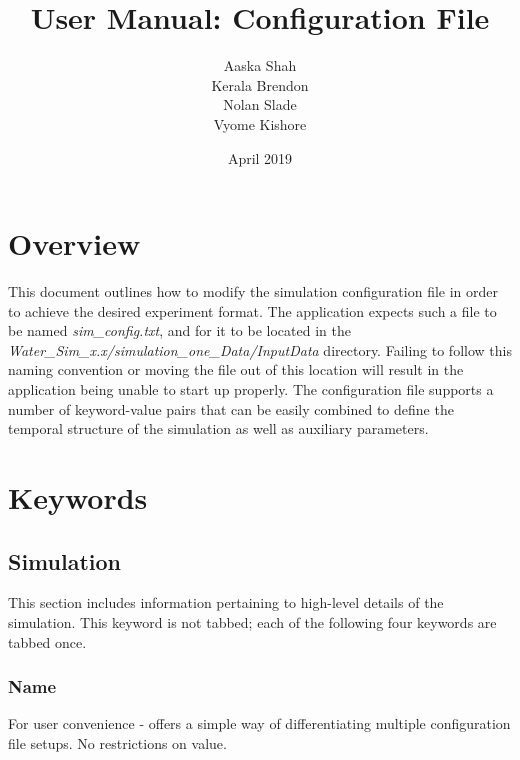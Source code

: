 \documentclass{article}
\title{User Manual: Configuration File}
\author{Aaska Shah\\Kerala Brendon\\Nolan Slade\\Vyome Kishore}
\date{April 2019}
\begin{document}
\maketitle

\section*{Overview}
This document outlines how to modify the simulation configuration file in order to achieve the desired experiment format. The application expects such a file to be named \textit{sim\_config.txt}, and for it to be located in the \textit{Water\_Sim\_x.x\slash simulation\_one\_Data\slash InputData} directory. Failing to follow this naming convention or moving the file out of this location will result in the application being unable to start up properly. The configuration file supports a number of keyword-value pairs that can be easily combined to define the temporal structure of the simulation as well as auxiliary parameters. 

\section*{Keywords}
\subsection*{Simulation}
This section includes information pertaining to high-level details of the simulation. This keyword is not tabbed; each of the following four keywords are tabbed once.

\subsubsection*{Name} For user convenience - offers a simple way of differentiating multiple configuration file setups. No restrictions on value. 

%
\end{document}
